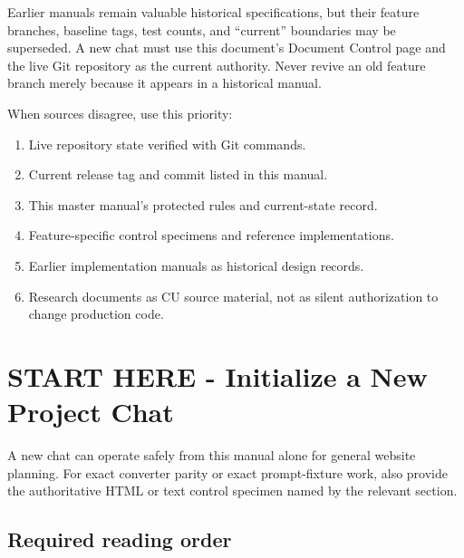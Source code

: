 \documentclass[11pt,letterpaper]{article}
\begin{document}
\begin{safetybox}
Earlier manuals remain valuable historical specifications, but their feature
branches, baseline tags, test counts, and ``current'' boundaries may be
superseded. A new chat must use this document's Document Control page and the
live Git repository as the current authority. Never revive an old feature
branch merely because it appears in a historical manual.
\end{safetybox}

\begin{authoritybox}
When sources disagree, use this priority:
\begin{enumerate}
    \item Live repository state verified with Git commands.
    \item Current release tag and commit listed in this manual.
    \item This master manual's protected rules and current-state record.
    \item Feature-specific control specimens and reference implementations.
    \item Earlier implementation manuals as historical design records.
    \item Research documents as CU source material, not as silent authorization
          to change production code.
\end{enumerate}
\end{authoritybox}

\clearpage
\tableofcontents
\clearpage

\section*{START HERE - Initialize a New Project Chat}

\begin{successbox}
A new chat can operate safely from this manual alone for general website
planning. For exact converter parity or exact prompt-fixture work, also provide
the authoritative HTML or text control specimen named by the relevant section.
\end{successbox}

\subsection*{Required reading order}
\end{document}
